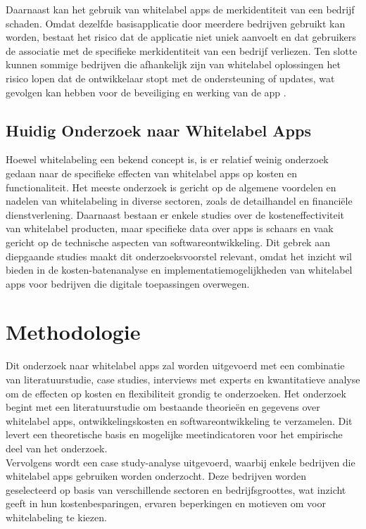 Daarnaast kan het gebruik van whitelabel apps de merkidentiteit van een bedrijf schaden. 
Omdat dezelfde basisapplicatie door meerdere bedrijven gebruikt kan worden, bestaat het risico dat de applicatie niet uniek aanvoelt en dat gebruikers de associatie met de specifieke merkidentiteit van een bedrijf verliezen. 
Ten slotte kunnen sommige bedrijven die afhankelijk zijn van whitelabel oplossingen het risico lopen dat de ontwikkelaar stopt met de ondersteuning of updates, wat gevolgen kan hebben voor de beveiliging en werking van de app \autocite{Vendesta2023}.

\subsection{Huidig Onderzoek naar Whitelabel Apps}
Hoewel whitelabeling een bekend concept is, is er relatief weinig onderzoek gedaan naar de specifieke effecten van whitelabel apps op kosten en functionaliteit. 
Het meeste onderzoek is gericht op de algemene voordelen en nadelen van whitelabeling in diverse sectoren, zoals de detailhandel en financiële dienstverlening. 
Daarnaast bestaan er enkele studies over de kosteneffectiviteit van whitelabel producten, maar specifieke data over apps is schaars en vaak gericht op de technische aspecten van softwareontwikkeling. 
Dit gebrek aan diepgaande studies maakt dit onderzoeksvoorstel relevant, omdat het inzicht wil bieden in de kosten-batenanalyse en implementatiemogelijkheden van whitelabel apps voor bedrijven die digitale toepassingen overwegen.
\section{Methodologie}%
\label{sec:methodologie}

Dit onderzoek naar whitelabel apps zal worden uitgevoerd met een combinatie van literatuurstudie, case studies, interviews met experts en kwantitatieve analyse om de effecten op kosten en flexibiliteit grondig te onderzoeken.
Het onderzoek begint met een literatuurstudie om bestaande theorieën en gegevens over whitelabel apps, ontwikkelingskosten en softwareontwikkeling te verzamelen. 
Dit levert een theoretische basis en mogelijke meetindicatoren voor het empirische deel van het onderzoek. \\

Vervolgens wordt een case study-analyse uitgevoerd, waarbij enkele bedrijven die whitelabel apps gebruiken worden onderzocht. 
Deze bedrijven worden geselecteerd op basis van verschillende sectoren en bedrijfsgroottes, wat inzicht geeft in hun kostenbesparingen, ervaren beperkingen en motieven om voor whitelabeling te kiezen.\\

